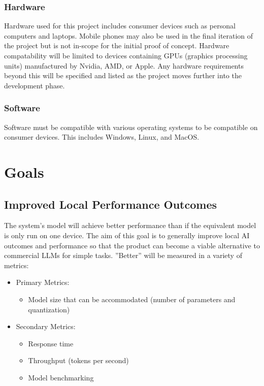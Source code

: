 \documentclass{article}
\begin{document}
\subsubsection{Hardware}

Hardware used for this project includes consumer devices such as personal computers and laptops. Mobile phones may also be used in the final iteration of the project but is not in-scope for the initial proof of concept.
Hardware compatability will be limited to devices containing GPUs (graphics processing units) manufactured by Nvidia, AMD, or Apple. Any hardware requirements beyond this will be specified and listed as the project moves further into the development phase.

\subsubsection{Software}

Software must be compatible with various operating systems to be compatible on consumer devices. This includes Windows, Linux, and MacOS.

\section{Goals}

\subsection{Improved Local Performance Outcomes}
The system's model will achieve better performance than if the equivalent model is only run on one
device. The aim of this goal is to generally improve local AI outcomes and performance so that the
product can become a viable alternative to commercial LLMs for simple tasks. ''Better'' will be
measured in a variety of metrics:
\begin{itemize}
	\item Primary Metrics:
		\begin{itemize}
			\item Model size that can be accommodated (number of parameters and quantization)
		\end{itemize}
	\item Secondary Metrics:
		\begin{itemize}
			\item Response time
			\item Throughput (tokens per second)
			\item Model benchmarking
		\end{itemize}
\end{itemize}
\end{document}

